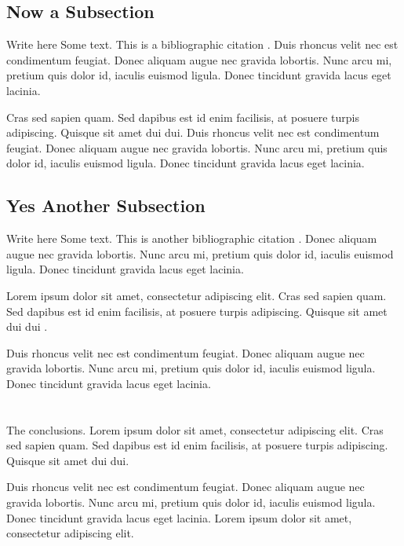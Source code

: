 \documentclass[a4paper,12pt,journal,twoside,compsoc]{PPIEEEtran}
\begin{document}
\subsection{Now a Subsection}
Write here Some text. This is a bibliographic citation \cite{RFC_INTSERV}.
Duis rhoncus velit nec est condimentum feugiat. Donec aliquam augue nec gravida lobortis. Nunc arcu mi, pretium quis dolor id, iaculis euismod ligula. Donec tincidunt gravida lacus eget lacinia.

Cras sed sapien quam. Sed dapibus est id enim facilisis, at posuere turpis adipiscing. Quisque sit amet dui dui.
Duis rhoncus velit nec est condimentum feugiat. Donec aliquam augue nec gravida lobortis. Nunc arcu mi, pretium quis dolor id, iaculis euismod ligula. Donec tincidunt gravida lacus eget lacinia. 
\subsection{Yes Another Subsection}
Write here Some text. This is another bibliographic citation \cite{lamport:latex}. Donec aliquam augue nec gravida lobortis. Nunc arcu mi, pretium quis dolor id, iaculis euismod ligula. Donec tincidunt gravida lacus eget lacinia. 

Lorem ipsum dolor sit amet, consectetur adipiscing elit. Cras sed sapien quam. Sed dapibus est id enim facilisis, at posuere turpis adipiscing. Quisque sit amet dui dui \cite{lamport:latex}.

Duis rhoncus velit nec est condimentum feugiat. Donec aliquam augue nec gravida lobortis. Nunc arcu mi, pretium quis dolor id, iaculis euismod ligula. Donec tincidunt gravida lacus eget lacinia.
\section{}
\label{concl}
The conclusions. Lorem ipsum dolor sit amet, consectetur adipiscing elit. Cras sed sapien quam. Sed dapibus est id enim facilisis, at posuere turpis adipiscing. Quisque sit amet dui dui.

Duis rhoncus velit nec est condimentum feugiat. Donec aliquam augue nec gravida lobortis. Nunc arcu mi, pretium quis dolor id, iaculis euismod ligula. Donec tincidunt gravida lacus eget lacinia. Lorem ipsum dolor sit amet, consectetur adipiscing elit.


\ifCLASSOPTIONcompsoc
\end{document}
